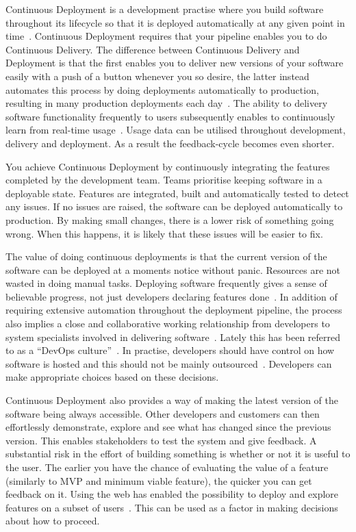 \documentclass[english]{tktltiki2}
\begin{document}
Continuous Deployment is a development practise where you build software throughout its lifecycle so that it is deployed automatically at any given point in time~\cite{Fow13a}. Continuous Deployment requires that your pipeline enables you to do Continuous Delivery. The difference between Continuous Delivery and Deployment is that the first enables you to deliver new versions of your software easily with a push of a button whenever you so desire, the latter instead automates this process by doing deployments automatically to production, resulting in many production deployments each day~\cite{OR11, Sny13, Rub14}. The ability to delivery software functionality frequently to users subsequently enables to continuously learn from real-time usage~\cite{HAB12}. Usage data can be utilised throughout development, delivery and deployment. As a result the feedback-cycle becomes even shorter.

You achieve Continuous Deployment by continuously integrating the features completed by the development team. Teams prioritise keeping software in a deployable state. Features are integrated, built and automatically tested to detect any issues. If no issues are raised, the software can be deployed automatically to production. By making small changes, there is a lower risk of something going wrong. When this happens, it is likely that these issues will be easier to fix.

The value of doing continuous deployments is that the current version of the software can be deployed at a moments notice without panic. Resources are not wasted in doing manual tasks. Deploying software frequently gives a sense of believable progress, not just developers declaring features done~\cite{Fow13a}. In addition of requiring extensive automation throughout the deployment pipeline, the process also implies a close and collaborative working relationship from developers to system specialists involved in delivering software~\cite{HAB12, Fow13a}. Lately this has been referred to as a “DevOps culture”~\cite{Fow13a}. In practise, developers should have control on how software is hosted and this should not be mainly outsourced~\cite{HF11}. Developers can make appropriate choices based on these decisions.

Continuous Deployment also provides a way of making the latest version of the software being always accessible. Other developers and customers can then effortlessly demonstrate, explore and see what has changed since the previous version. This enables stakeholders to test the system and give feedback. A substantial risk in the effort of building something is whether or not it is useful to the user. The earlier you have the chance of evaluating the value of a feature (similarly to MVP and minimum viable feature), the quicker you can get feedback on it. Using the web has enabled the possibility to deploy and explore features on a subset of users~\cite{Fow06, Fow13a}. This can be used as a factor in making decisions about how to proceed.
\end{document}
